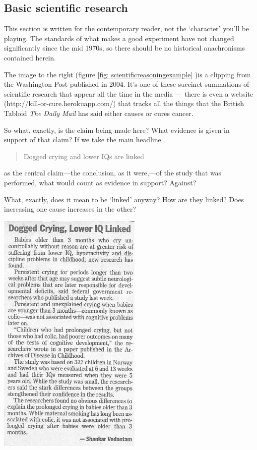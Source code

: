 \begin{refsection}
\subsection{Basic scientific research}
\label{basicscientificresearch}

This section is written for the contemporary reader, not the `character' you'll be playing. The standards of what makes a good experiment have not changed significantly since the mid 1970s, so there should be no historical anachronisms contained herein.

The image to the right (figure \ref{fig: scientificreasoningexample} )is a clipping from the Washington Post published in 2004. It's one of these succinct summations of scientific research that appear all the time in the media --- there is even a website (http:\slash \slash kill-or-cure.herokuapp.com\slash ) that tracks all the things that the British Tabloid \emph{The Daily Mail} has said either causes or cures cancer.

So what, exactly, is the claim being made here? What evidence is given in support of that claim? If we take the main headline

\begin{quote}

Dogged crying and lower IQs are linked
\end{quote}

as the central claim---the conclusion, as it were,---of the study that was performed, what would count as evidence in support? Against? 

What, exactly, does it mean to be `linked' anyway? How are they linked? Does increasing one cause increases in the other?
\begin{marginfigure}
 \begin{center}


     \includegraphics[scale=0.50]{../images/scientificReasoning2.jpg}
\end{center}
 \caption{ ~\citep{Vedantam:2004tz}}
\label{fig: scientificreasoningexample}
\end{marginfigure}


\end{refsection}
